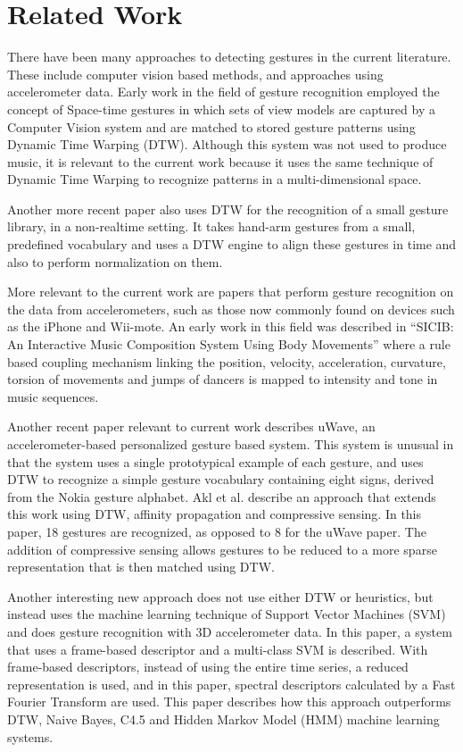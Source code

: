 \documentclass[twoside,10pt,a4paper]{article}
\begin{document}
\section{Related Work}

There have been many approaches to detecting gestures in the current
literature.  These include computer vision based methods, and
approaches using accelerometer data. Early work in the field of
gesture recognition employed the concept of Space-time gestures
\cite{darrell93} in which sets of view models are captured by a
Computer Vision system and are matched to stored gesture patterns
using Dynamic Time Warping (DTW). Although this system was not used to
produce music, it is relevant to the current work because it uses the
same technique of Dynamic Time Warping to recognize patterns in a
multi-dimensional space.

Another more recent paper \cite{corradini01} also uses DTW for the
recognition of a small gesture library, in a non-realtime setting.  It
takes hand-arm gestures from a small, predefined vocabulary and uses a
DTW engine to align these gestures in time and also to perform
normalization on them. 

More relevant to the current work are papers that perform gesture
recognition on the data from accelerometers, such as those now
commonly found on devices such as the iPhone and Wii-mote.  An early
work in this field was described in ``SICIB: An Interactive Music
Composition System Using Body Movements'' \cite{moralesmanzanares01}
where a rule based coupling mechanism linking the position, velocity,
acceleration, curvature, torsion of movements and jumps of dancers is
mapped to intensity and tone in music sequences.

Another recent paper relevant to current work describes
uWave\cite{liu09}, an accelerometer-based personalized gesture based
system.  This system is unusual in that the system uses a single
prototypical example of each gesture, and uses DTW to recognize a
simple gesture vocabulary containing eight signs, derived from the
Nokia gesture alphabet. Akl et al. \cite{akl10} describe an approach
that extends this work using DTW, affinity propagation and compressive
sensing.  In this paper, 18 gestures are recognized, as opposed to 8
for the uWave\cite{liu09} paper.  The addition of compressive sensing
allows gestures to be reduced to a more sparse representation that is
then matched using DTW.

Another interesting new approach \cite{wu09} does not use either DTW
or heuristics, but instead uses the machine learning technique of
Support Vector Machines (SVM) and does gesture recognition with 3D
accelerometer data.  In this paper, a system that uses a frame-based
descriptor and a multi-class SVM is described.  With frame-based
descriptors, instead of using the entire time series, a reduced
representation is used, and in this paper, spectral descriptors
calculated by a Fast Fourier Transform are used.  This paper describes
how this approach outperforms DTW, Naive Bayes, C4.5 and Hidden Markov
Model (HMM) machine learning systems.
\end{document}
